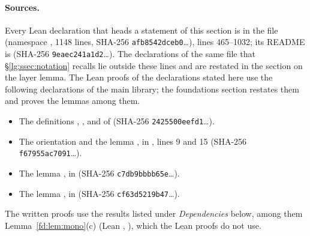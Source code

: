 \paragraph{Sources.} Every Lean declaration that heads a statement of this section is in the file
 (namespace , 1148 lines, SHA-256
\texttt{afb8542dceb0}\dots), lines 465--1032; its README is  (SHA-256
\texttt{9eaec241a1d2}\dots). The declarations of the same file that \S\ref{lg:ssec:notation} recalls lie outside
these lines and are restated in the section on the layer lemma. The Lean proofs of the declarations stated here use the following
declarations of the main library; the foundations section restates them and proves the lemmas among them.
\begin{itemize}
\item The definitions , ,  and 
  of\newline {} (SHA-256 \texttt{2425500eefd1}\dots).
\item The orientation  and the lemma ,\newline
  in , lines 9 and 15 (SHA-256 \texttt{f67955ac7091}\dots).
\item The lemma ,\newline
  in  (SHA-256 \texttt{c7db9bbbb65e}\dots).
\item The lemma ,\newline
  in  (SHA-256 \texttt{cf63d5219b47}\dots).
\end{itemize}
The written proofs use the results listed under \emph{Dependencies} below, among them Lemma~\ref{fd:lem:mono}(c)
(Lean , ), which the Lean proofs do not use.


